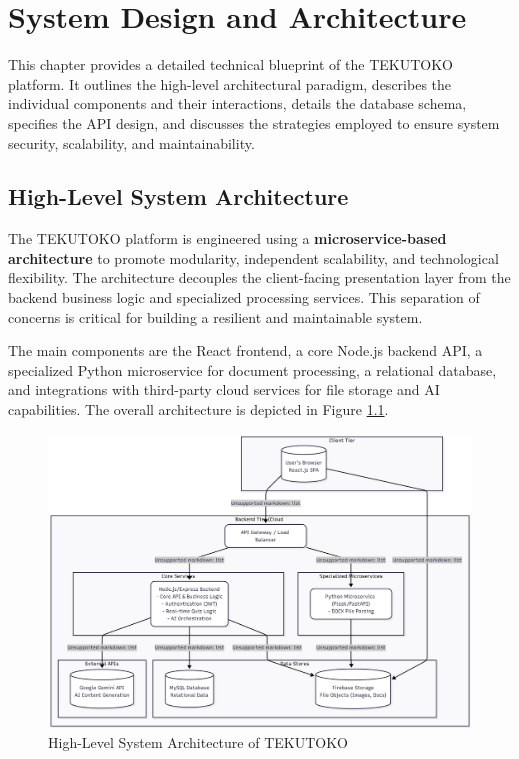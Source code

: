 \chapter{System Design and Architecture}
\label{chap:architecture}

This chapter provides a detailed technical blueprint of the TEKUTOKO platform. It outlines the high-level architectural paradigm, describes the individual components and their interactions, details the database schema, specifies the API design, and discusses the strategies employed to ensure system security, scalability, and maintainability.

\section{High-Level System Architecture}
\label{sec:arch-high-level}
The TEKUTOKO platform is engineered using a \textbf{microservice-based architecture} to promote modularity, independent scalability, and technological flexibility. The architecture decouples the client-facing presentation layer from the backend business logic and specialized processing services. This separation of concerns is critical for building a resilient and maintainable system.

The main components are the React frontend, a core Node.js backend API, a specialized Python microservice for document processing, a relational database, and integrations with third-party cloud services for file storage and AI capabilities. The overall architecture is depicted in Figure \ref{fig:system-architecture}.

\begin{figure}[htbp]
\centering
\includegraphics[width=\textwidth]{figures/system-architecture.png}
\caption{High-Level System Architecture of TEKUTOKO}
\label{fig:system-architecture}
\end{figure}

